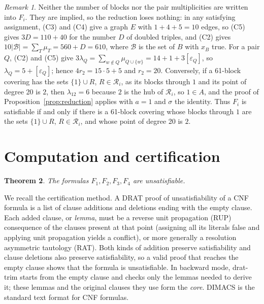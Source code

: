 \documentclass[11pt]{amsart}
\newtheorem{theorem}{Theorem}[section]
\theoremstyle{definition}
\theoremstyle{remark}
\newtheorem{remark}[theorem]{Remark}
\newcommand{\cB}{\mathcal{B}}
\newcommand{\cR}{\mathcal{R}}
\begin{document}
\begin{remark}\label{rem:exact}
Neither the number of blocks nor the pair multiplicities are written into
$F_i$. They are implied, so the reduction loses nothing: in any satisfying
assignment, (C3) and (C4) give a graph $E$ with $1+4+5=10$ edges, so (C5)
gives $3D=110+40$ for the number $D$ of doubled triples, and (C2) gives
$10|\cB|=\sum_T\mu_T=560+D=610$, where $\cB$ is the set of $B$ with $x_B$
true. For a pair $Q$, (C2) and (C5) give $3\lambda_Q=\sum_{w\notin
Q}\mu_{Q\cup\{w\}}=14+1+3[\varepsilon_Q]$, so $\lambda_Q=5+[\varepsilon_Q]$;
hence $4r_2=15\cdot 5+5$ and $r_2=20$. Conversely, if a 61-block covering has
the sets $\{1\}\cup R$, $R\in\cR_i$, as its blocks through $1$ and its point
of degree 20 is $2$, then $\lambda_{12}=6$ because $2$ is the hub of $\cR_i$,
so $1\in A$, and the proof of Proposition~\ref{prop:reduction} applies with
$a=1$ and $\sigma$ the identity. Thus $F_i$ is satisfiable if and only if
there is a 61-block covering whose blocks through $1$ are the sets $\{1\}\cup
R$, $R\in\cR_i$, and whose point of degree 20 is $2$.
\end{remark}

\section{Computation and certification}\label{sec:computation}

\begin{theorem}\label{thm:unsat}
The formulas $F_1,F_2,F_3,F_4$ are unsatisfiable.
\end{theorem}

We recall the certification method. A DRAT proof of unsatisfiability of a
CNF formula is a list of clause additions and deletions ending with the empty
clause. Each added clause, or \emph{lemma}, must be a reverse unit
propagation (RUP) consequence of the clauses present at that point (assigning
all its literals false and applying unit propagation yields a conflict), or
more generally a resolution asymmetric tautology (RAT). Both kinds of addition
preserve satisfiability and clause deletions also preserve satisfiability,
so a valid proof that reaches the empty clause shows that the
formula is unsatisfiable. In backward mode, drat-trim starts from the empty
clause and checks only the lemmas needed to derive it; these lemmas and the
original clauses they use form the \emph{core}. DIMACS is the standard text
format for CNF formulas.
\end{document}
